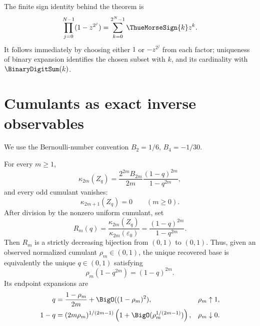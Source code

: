 The finite sign identity behind the theorem is
\begin{equation}
 \prod_{j=0}^{N-1}(1-z^{2^j})
 =\sum_{k=0}^{2^N-1}\ThueMorseSign{k}z^k.
 \label{eq:fr-thue-morse-product}
\end{equation}
It follows immediately by choosing either \(1\) or \(-z^{2^j}\) from each
factor; uniqueness of binary expansion identifies the chosen subset with
\(k\), and its cardinality with \(\BinaryDigitSum(k)\).

\section{Cumulants as exact inverse observables}
\label{sec:fr-cumulant-recovery}

We use the Bernoulli-number convention \(B_2=1/6\), \(B_4=-1/30\).

\begin{theorem}
\label{thm:fr-cumulant-recovery}
For every \(m\ge1\),
\begin{equation}
 \kappa_{2m}(Z_q)
 =\frac{2^{2m}B_{2m}}{2m}
   \frac{(1-q)^{2m}}{1-q^{2m}},
 \label{eq:fr-cumulants}
\end{equation}
and every odd cumulant vanishes:
\begin{equation}
 \kappa_{2m+1}(Z_q)=0\qquad(m\ge0).
 \label{eq:fr-odd-cumulants}
\end{equation}
After division by the nonzero uniform cumulant, set
\[
 R_m(q)=\frac{\kappa_{2m}(Z_q)}{\kappa_{2m}(\varepsilon_0)}
 =\frac{(1-q)^{2m}}{1-q^{2m}}.
\]
Then \(R_m\) is a strictly decreasing bijection from \((0,1)\) to \((0,1)\).
Thus, given an observed normalized cumulant \(\rho_m\in(0,1)\), the unique
recovered base is equivalently the unique \(q\in(0,1)\) satisfying
\begin{equation}
 \rho_m(1-q^{2m})=(1-q)^{2m}.
 \label{eq:fr-cumulant-polynomial}
\end{equation}
Its endpoint expansions are
\begin{align}
 q&=\frac{1-\rho_m}{2m}+\BigO((1-\rho_m)^2),
 &&\rho_m\uparrow1,\label{eq:fr-cumulant-qzero}\\
 1-q&=(2m\rho_m)^{1/(2m-1)}
 \left(1+\BigO(\rho_m^{1/(2m-1)})\right),
 &&\rho_m\downarrow0.\label{eq:fr-cumulant-qone}
\end{align}
\end{theorem}

